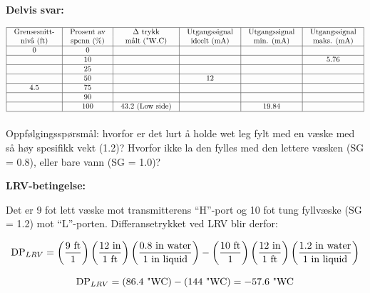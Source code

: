 





{\bf Delvis svar:}


$$\vbox{\offinterlineskip
\halign{\strut
\vrule \quad\hfil # \ \hfil & 
\vrule \quad\hfil # \ \hfil & 
\vrule \quad\hfil # \ \hfil & 
\vrule \quad\hfil # \ \hfil & 
\vrule \quad\hfil # \ \hfil & 
\vrule \quad\hfil # \ \hfil \vrule \cr
\noalign{\hrule}
%
Grensesnitt- & Prosent av & $\Delta$ trykk & Utgangssignal & Utgangssignal & Utgangssignal \cr
%
nivå (ft) & spenn (\%) & målt ("W.C) & ideelt (mA) & min. (mA) & maks. (mA) \cr
%
\noalign{\hrule}
%
0 & 0 &  &  &  &  \cr
%
\noalign{\hrule}
%
  & 10 &  &  &  & 5.76 \cr
%
\noalign{\hrule}
%
  & 25 &  &  &  &  \cr
%
\noalign{\hrule}
%
  & 50 &  & 12 &  &  \cr
%
\noalign{\hrule}
%
4.5  & 75 &  &  &  &  \cr
%
\noalign{\hrule}
%
  & 90 &  &  &  &  \cr
%
\noalign{\hrule}
%
 & 100 & 43.2 (Low side) &  & 19.84 &  \cr
%
\noalign{\hrule}
} %
}$$ %

\vskip 10pt

Oppfølgingsspørsmål: hvorfor er det lurt å holde wet leg fylt med en væske med så høy spesifikk vekt (1.2)?  Hvorfor ikke la den fylles med den lettere væsken (SG = 0.8), eller bare vann (SG = 1.0)?







\noindent
{\bf LRV-betingelse:}

Det er 9 fot lett væske mot transmitterens ``H''-port og 10 fot tung fyllvæske (SG = 1.2) mot ``L''-porten.  Differansetrykket ved LRV blir derfor:

$$\hbox{DP}_{LRV} = \left(9 \hbox{ ft} \over 1 \right) \left(12 \hbox{ in} \over 1 \hbox{ ft}\right) \left(0.8 \hbox{ in water} \over 1 \hbox{ in liquid} \right) - \left(10 \hbox{ ft} \over 1 \right) \left(12 \hbox{ in} \over 1 \hbox{ ft}\right) \left(1.2 \hbox{ in water} \over 1 \hbox{ in liquid} \right) $$

$$\hbox{DP}_{LRV} = (86.4 \hbox{ "WC}) - (144 \hbox{ "WC}) = -57.6 \hbox{ "WC}$$

